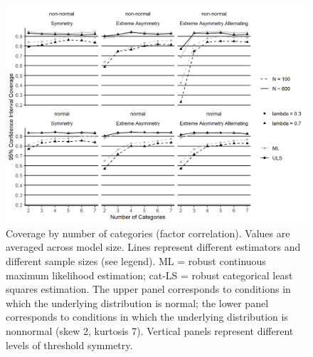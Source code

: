 \documentclass[10,a4paperpaper,]{article}
\begin{document}
\begin{figure}
\includegraphics[width=445pt]{./figures/fig_8} \caption{Coverage by number of categories (factor correlation). Values are averaged across model size. Lines represent different estimators and different sample sizes (see legend). ML = robust continuous maximum likelihood estimation; cat-LS = robust categorical least squares estimation. The upper panel corresponds to conditions in which the underlying distribution is normal; the lower panel corresponds to conditions in which the underlying distribution is nonnormal (skew 2, kurtosis 7). Vertical panels represent different levels of threshold symmetry.}\label{fig:unnamed-chunk-7}
\end{figure}
\end{document}

